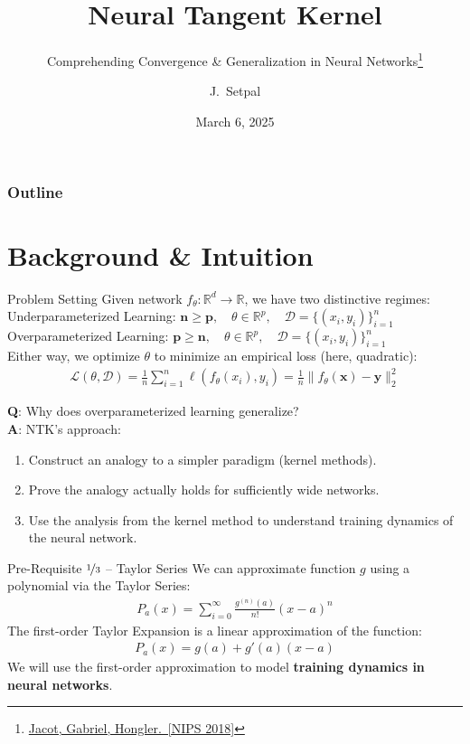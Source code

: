 \documentclass{beamer}
\title[Neural Tangent Kernel]{Neural Tangent Kernel}
\subtitle{Comprehending Convergence \& Generalization in Neural Networks\thanks{\href{https://arxiv.org/abs/1806.07572}{Jacot, Gabriel, Hongler.~[NIPS 2018]}}}
\author[Machine Learning @ Purdue] %
{J.~Setpal}
\date{March 6, 2025}
\begin{document}
\frame{\titlepage}


\begin{frame}
\frametitle{Outline}
\tableofcontents
\end{frame}

\section{Background \& Intuition}

\begin{frame}{Problem Setting}
	Given network $f_\theta: \mathbb{R}^d \rightarrow \mathbb{R}$, we have two distinctive regimes: \\
	Underparameterized Learning: $\bm{n \geq p}, \quad \theta \in \mathbb{R}^p, \quad \mathcal{D} = \{(x_i, y_i)\}^n_{i=1}$ \\
	Overparameterized Learning: $\bm{p \geq n}, \quad \theta \in \mathbb{R}^p, \quad \mathcal{D} = \{(x_i, y_i)\}^n_{i=1}$ \pause \newline \\

	Either way, we optimize $\theta$ to minimize an empirical loss (here, quadratic):
	\begin{gather}
		\mathcal{L}(\theta, \mathcal{D}) = \frac{1}{n} \sum^n_{i=1} \ell(f_\theta(x_i), y_i) = \frac{1}{n} \| f_\theta(\bm{x}) - \bm{y} \|^2_2
	\end{gather} \pause

	\textbf{Q}: Why does overparameterized learning generalize? \pause \\
	\textbf{A}: NTK's approach:
	\begin{enumerate}[label=\alph*.]
		\item Construct an analogy to a simpler paradigm (kernel methods). \pause
		\item Prove the analogy actually holds for sufficiently wide networks. \pause
		\item Use the analysis from the kernel method to understand training dynamics of the neural network.
	\end{enumerate}
\end{frame}

\begin{frame}{Pre-Requisite $\nicefrac{1}{3}$ -- Taylor Series}
	We can approximate function $g$ using a polynomial via the Taylor Series:
	\begin{gather}
		P_a(x) = \sum^\infty_{i=0} \frac{g^{(n)}(a)}{n!}(x - a)^{n}
	\end{gather} \pause
	The first-order Taylor Expansion is a linear approximation of the function:
	\begin{gather}
		P_a(x) = g(a) + g'(a)(x - a)
	\end{gather} \pause
	We will use the first-order approximation to model \textbf{training dynamics in neural networks}.
\end{frame}
\end{document}
